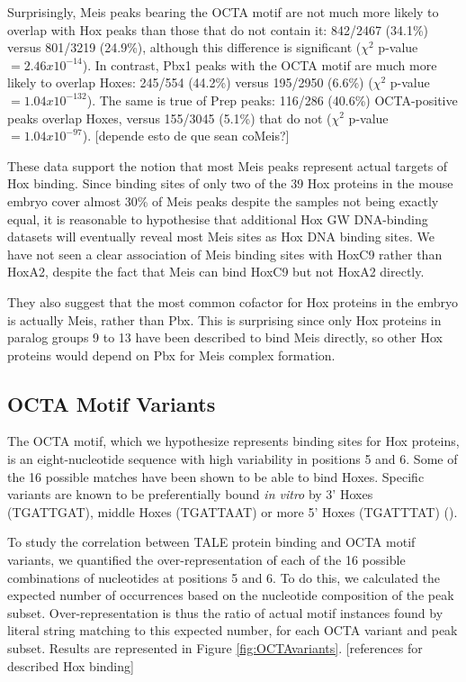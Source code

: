 Surprisingly, Meis peaks bearing the \ac{OCTA} motif are not much more likely to overlap with Hox peaks than those that do not contain it: 842/2467 (34.1\%) versus 801/3219 (24.9\%), although this difference is significant ($\chi^2$ p-value $= 2.46 x 10^{-14}$). In contrast, Pbx1 peaks with the \ac{OCTA} motif are much more likely to overlap Hoxes: 245/554 (44.2\%) versus 195/2950 (6.6\%) ($\chi^2$ p-value $= 1.04 x 10^{-132}$). The same is true of Prep peaks: 116/286 (40.6\%) \ac{OCTA}-positive peaks overlap Hoxes, versus 155/3045 (5.1\%) that do not ($\chi^2$ p-value $= 1.04 x 10^{-97}$).
[depende esto de que sean coMeis?]

These data support the notion that most Meis peaks represent actual targets of Hox binding. Since binding sites of only two of the 39 Hox proteins in the mouse embryo cover almost 30\% of Meis peaks despite the samples not being exactly equal, it is reasonable to hypothesise that additional Hox \ac{GW} DNA-binding datasets will eventually reveal most Meis sites as Hox DNA binding sites. We have not seen a clear association of Meis binding sites with HoxC9 rather than HoxA2, despite the fact that Meis can bind HoxC9 but not HoxA2 directly.

They also suggest that the most common cofactor for Hox proteins in the embryo is actually Meis, rather than Pbx. This is surprising since only Hox proteins in paralog groups 9 to 13 have been described to bind Meis directly, so other Hox proteins would depend on Pbx for Meis complex formation. 

\subsection{OCTA Motif Variants}

The \ac{OCTA} motif, which we hypothesize represents binding sites for Hox proteins, is an eight-nucleotide sequence with high variability in positions 5 and 6. Some of the 16 possible matches have been shown to be able to bind Hoxes. Specific variants are known to be preferentially bound \textit{in vitro} by 3' Hoxes (TGATTGAT), middle Hoxes (TGATTAAT) or more 5' Hoxes (TGATTTAT) (\cite{Shen1997a,Slattery2011}).

To study the correlation between \ac{TALE} protein binding and \ac{OCTA} motif variants, we quantified the over-representation of each of the 16 possible combinations of nucleotides at positions 5 and 6. To do this, we calculated the expected number of occurrences based on the nucleotide composition of the peak subset. Over-representation is thus the ratio of actual motif instances found by literal string matching to this expected number, for each \ac{OCTA} variant and peak subset. Results are represented in Figure \ref{fig:OCTAvariants}. [references for described Hox binding] 

